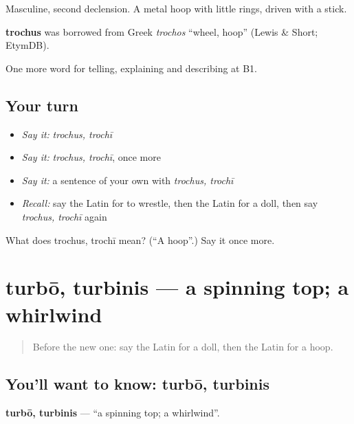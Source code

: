 Masculine, second declension. A metal hoop with little rings, driven with a stick.

\begin{cousinweb}
\textbf{trochus} was borrowed from Greek \emph{trochos} \textquotedblleft{}wheel, hoop\textquotedblright{} (Lewis \& Short; EtymDB).
\end{cousinweb}

\begin{grammarlens}[title={What you've built}]
One more word for telling, explaining and describing at B1.
\end{grammarlens}

\subsection*{Your turn}
\begin{itemize}
\raggedright
  \item \emph{Say it:} \emph{trochus, trochī}
  \item \emph{Say it:} \emph{trochus, trochī}, once more
  \item \emph{Say it:} a sentence of your own with \emph{trochus, trochī}
  \item \emph{Recall:} say the Latin for to wrestle, then the Latin for a doll, then say \emph{trochus, trochī} again
\end{itemize}

\begin{tcolorbox}[breakable,colback=teal!4,colframe=teal!35!black,title={Before you move on}]
What does trochus, trochī mean? (\textquotedblleft{}A hoop\textquotedblright{}.) Say it once more.
\end{tcolorbox}
\section[turbō, turbinis]{turbō, turbinis — a spinning top; a whirlwind}

\label{lesson:LA-C540-turbo}



\begin{quote}
Before the new one: say the Latin for a doll, then the Latin for a hoop.
\end{quote}

\subsection*{You'll want to know: turbō, turbinis}
\textbf{turbō, turbinis} — \textquotedblleft{}a spinning top; a whirlwind\textquotedblright{}.

